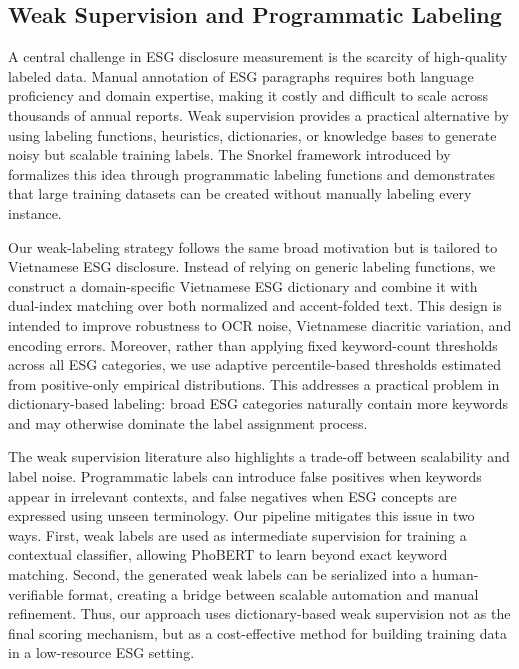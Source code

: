 \documentclass{article}
\theoremstyle{plain}
\theoremstyle{definition}
\theoremstyle{remark}
\begin{document}
\subsection{Weak Supervision and Programmatic Labeling}

A central challenge in ESG disclosure measurement is the scarcity of high-quality labeled data. 
Manual annotation of ESG paragraphs requires both language proficiency and domain expertise, making it costly and difficult to scale across thousands of annual reports. 
Weak supervision provides a practical alternative by using labeling functions, heuristics, dictionaries, or knowledge bases to generate noisy but scalable training labels. 
The Snorkel framework introduced by \citet{ratner2017snorkel} formalizes this idea through programmatic labeling functions and demonstrates that large training datasets can be created without manually labeling every instance.

Our weak-labeling strategy follows the same broad motivation but is tailored to Vietnamese ESG disclosure. 
Instead of relying on generic labeling functions, we construct a domain-specific Vietnamese ESG dictionary and combine it with dual-index matching over both normalized and accent-folded text. 
This design is intended to improve robustness to OCR noise, Vietnamese diacritic variation, and encoding errors. 
Moreover, rather than applying fixed keyword-count thresholds across all ESG categories, we use adaptive percentile-based thresholds estimated from positive-only empirical distributions. 
This addresses a practical problem in dictionary-based labeling: broad ESG categories naturally contain more keywords and may otherwise dominate the label assignment process.

The weak supervision literature also highlights a trade-off between scalability and label noise. 
Programmatic labels can introduce false positives when keywords appear in irrelevant contexts, and false negatives when ESG concepts are expressed using unseen terminology. 
Our pipeline mitigates this issue in two ways. 
First, weak labels are used as intermediate supervision for training a contextual classifier, allowing PhoBERT to learn beyond exact keyword matching. 
Second, the generated weak labels can be serialized into a human-verifiable format, creating a bridge between scalable automation and manual refinement. 
Thus, our approach uses dictionary-based weak supervision not as the final scoring mechanism, but as a cost-effective method for building training data in a low-resource ESG setting.
\end{document}
